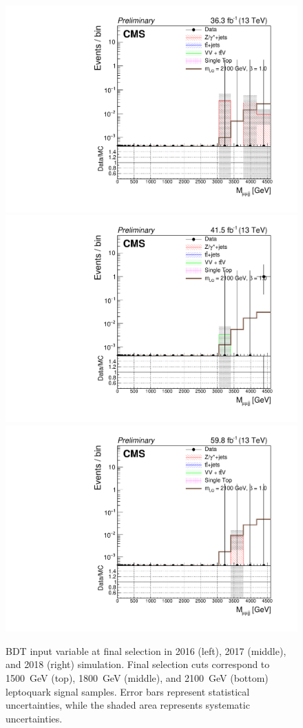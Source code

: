 \begin{figure}[H]
    {\includegraphics[width=.32\textwidth]{Images/Analysis/Results_2016_Unblinded/Plots/Final_selection/BasicLQ_uujj_M_uujj_final2100.pdf}}
    {\includegraphics[width=.32\textwidth]{Images/Analysis/Results_2017_Unblinded/Plots/Final_selection/BasicLQ_uujj_M_uujj_final2100.pdf}}
    {\includegraphics[width=.32\textwidth]{Images/Analysis/Results_2018_Unblinded/Plots/Final_selection/BasicLQ_uujj_M_uujj_final2100.pdf}}
    \caption{BDT input variable \Muujj at final selection in 2016 (left), 2017 (middle), and 2018 (right) simulation. Final selection cuts correspond to \SI{1500}{GeV} (top), \SI{1800}{GeV} (middle), and \SI{2100}{GeV} (bottom) leptoquark signal samples. Error bars represent statistical uncertainties, while the shaded area represents systematic uncertainties.
    \label{figapp:finalSelMuujj}}
\end{figure}
